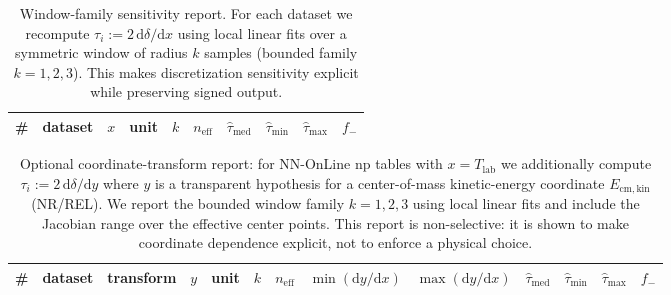 \begin{table}[h]
\centering
\small
\begin{tabular}{r l l l r r r r r r}
\toprule
\# & dataset & $x$ & unit & $k$ & $n_{\mathrm{eff}}$ & $\widehat{\tau}_{\mathrm{med}}$ & $\widehat{\tau}_{\min}$ & $\widehat{\tau}_{\max}$ & $f_{-}$ \\
\midrule
%
\end{tabular}
\caption{Window-family sensitivity report. For each dataset we recompute $\tau_i:=2\,\mathrm{d}\delta/\mathrm{d}x$ using local linear fits over a symmetric window of radius $k$ samples (bounded family $k=1,2,3$). This makes discretization sensitivity explicit while preserving signed output.}
\end{table}

\begin{table}[h]
\centering
\small
\begin{tabular}{r l l l l r r r r r r r r}
\toprule
\# & dataset & transform & $y$ & unit & $k$ & $n_{\mathrm{eff}}$ & $\min(\mathrm{d}y/\mathrm{d}x)$ & $\max(\mathrm{d}y/\mathrm{d}x)$ & $\widehat{\tau}_{\mathrm{med}}$ & $\widehat{\tau}_{\min}$ & $\widehat{\tau}_{\max}$ & $f_{-}$ \\
\midrule
%
\end{tabular}
\caption{Optional coordinate-transform report: for NN-OnLine np tables with $x=T_{\mathrm{lab}}$ we additionally compute $\tau_i:=2\,\mathrm{d}\delta/\mathrm{d}y$ where $y$ is a transparent hypothesis for a center-of-mass kinetic-energy coordinate $E_{\mathrm{cm,kin}}$ (NR/REL). We report the bounded window family $k=1,2,3$ using local linear fits and include the Jacobian range over the effective center points. This report is non-selective: it is shown to make coordinate dependence explicit, not to enforce a physical choice.}
\end{table}



